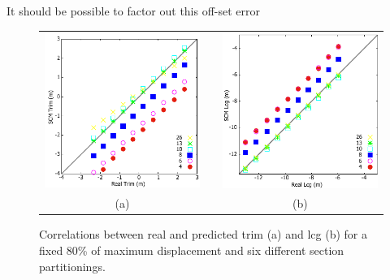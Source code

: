 \documentclass[runningheads]{llncs}
\begin{document}
It should be possible to factor out this off-set error 



\begin{figure}[h!]
\begin{center}
 \begin{tabular}{ccc}
  \includegraphics[scale=1]{figures/TrimVarSec} & & \includegraphics[scale=0.99]{figures/LcgVarSec} \\
  (a) & \hspace{5mm} & (b)
\end{tabular}  
\end{center}
\caption{Correlations between real and predicted trim (a) and lcg (b) for a fixed 80\% of maximum displacement and six different section partitionings.}
\label{fig:trimLcgFixDisp}
\end{figure}
\end{document}
